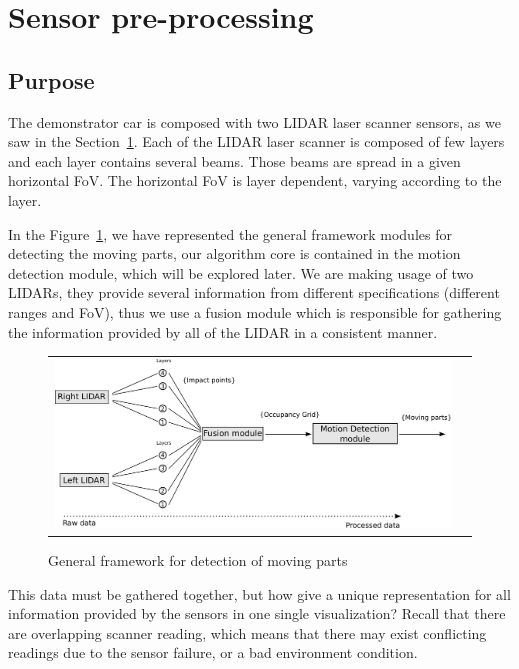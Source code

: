 \section{Sensor pre-processing} %
\label{sec:sensor:fusion}


\subsection{Purpose}

The demonstrator car is composed with two LIDAR laser scanner sensors, as we saw in the Section~\ref{sec:sensor:fusion}. Each of the LIDAR laser scanner is composed of few layers and each layer contains several beams. Those beams are spread in a given horizontal FoV. The horizontal FoV is layer dependent, varying according to the layer.

In the Figure~\ref{fig:motion:framework}, we have represented the general framework modules for detecting the moving parts, our algorithm core is contained in the motion detection module, which will be explored later. We are making usage of two LIDARs, they provide several information from different specifications (different ranges and FoV), thus we use a fusion module which is responsible for gathering the information provided by all of the LIDAR in a consistent manner.

\begin{figure}[h]
   \centering
     \begin{tabular}{lr}
       \includegraphics[scale=0.30]{img/fig:motion:framework}
     \end{tabular}
   \caption{General framework for detection of moving parts}
   \label{fig:motion:framework}
\end{figure}

This data must be gathered together, but how give a unique representation for all information provided by the sensors in one single visualization? Recall that there are overlapping scanner reading, which means that there may exist conflicting readings due to the sensor failure, or a bad environment condition.

